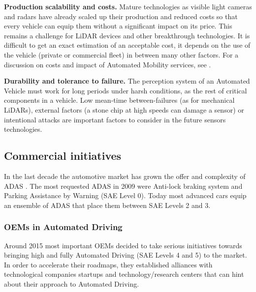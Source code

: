 \documentclass[journal]{IEEEtran}
\begin{document}
\textbf{Production scalability and costs.} 
Mature technologies as visible light cameras and radars have already scaled up 
their production and reduced costs so that every vehicle can equip them without
a significant impact on its price. This remains a challenge for LiDAR devices
and other breakthrough technologies.
It is difficult to get an exact estimation of an acceptable cost, 
it depends on the use of the vehicle (private or commercial fleet)
in between many other factors. 
For a discussion on costs and impact of Automated Mobility services, see
\cite{Bosch2018}.

\textbf{Durability and tolerance to failure.}
The perception system of an Automated Vehicle must work for long
periods under harsh conditions, as the rest of critical components in a vehicle.
Low mean-time between-failures (as for mechanical LiDARs), external factors 
(a stone chip at high speeds can damage a sensor) or intentional attacks \cite{Petit2015a}
are important factors to consider in the future sensors technologies.


\subsection{Commercial initiatives}

In the last decade the automotive market has grown the offer and complexity
of ADAS \cite{Perez2016}. The most requested ADAS in 2009
\cite{Frost&Sullivan2010} were Anti-lock braking system and Parking Assistance
by Warning (SAE Level 0). Today most advanced cars equip an ensemble of
ADAS that place them between SAE Levels 2 and 3. 

\subsubsection{OEMs in Automated Driving}
\label{sec:oem-ad}

Around 2015 most important OEMs decided to take serious initiatives towards
bringing high and fully Automated Driving (SAE Levels 4 and 5) to the market.
In order to accelerate their roadmaps, they established alliances with
technological companies startups and technology/research centers that
can hint about their approach to Automated Driving.
\end{document}
